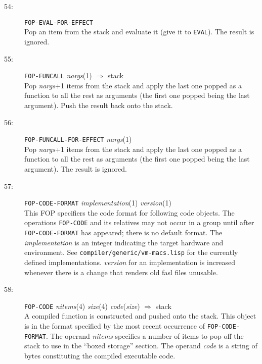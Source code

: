 \begin{description}
\item[54:] \hspace{2em} {\tt FOP-EVAL-FOR-EFFECT} \\
Pop an item from the stack and evaluate it (give it to {\tt EVAL}).
The result is ignored.

\item[55:] \hspace{2em} {\tt FOP-FUNCALL} \hspace{2em} {\it nargs}(1) \hspace{2em} $\Rightarrow$ \hspace{2em} stack \\
Pop {\it nargs}+1 items from the stack and apply the last one popped
as a function to
all the rest as arguments (the first one popped being the last argument).
Push the result back onto the stack.

\item[56:] \hspace{2em} {\tt FOP-FUNCALL-FOR-EFFECT} \hspace{2em} {\it nargs}(1) \\
Pop {\it nargs}+1 items from the stack and apply the last one popped
as a function to
all the rest as arguments (the first one popped being the last argument).
The result is ignored.

\item[57:] \hspace{2em} {\tt FOP-CODE-FORMAT} \hspace{2em} {\it implementation}(1)
\hspace{2em} {\it version}(1) \\
This FOP specifiers the code format for following code objects.  The operations
{\tt FOP-CODE} and its relatives may not occur in a group until after {\tt
FOP-CODE-FORMAT} has appeared; there is no default format.  The {\it
implementation} is an integer indicating the target hardware and environment.
See {\tt compiler/generic/vm-macs.lisp} for the currently defined
implementations.  {\it version} for an implementation is increased whenever
there is a change that renders old fasl files unusable.

\item[58:] \hspace{2em} {\tt FOP-CODE} \hspace{2em} {\it nitems}(4) \hspace{2em} {\it size}(4) \hspace{2em}
{\it code}({\it size}) \hspace{2em} $\Rightarrow$ \hspace{2em} stack \\
A compiled function is constructed and pushed onto the stack.
This object is in the format specified by the most recent
occurrence of {\tt FOP-CODE-FORMAT}.
The operand {\it nitems} specifies a number of items to pop off
the stack to use in the ``boxed storage'' section.  The operand {\it code}
is a string of bytes constituting the compiled executable code.


\end{description}
